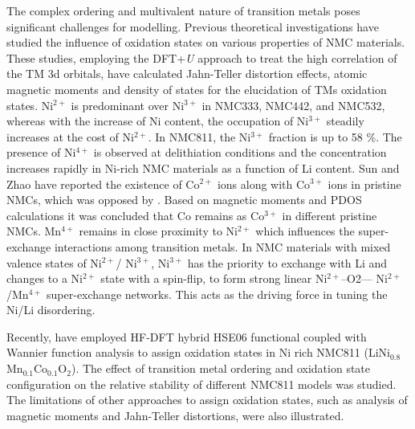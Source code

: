 \documentclass[journal=jacsat,manuscript=article]{achemso}
\newcommand{\re}[1]{\textcolor{red}{#1}}
\begin{document}
The complex ordering and multivalent nature of transition metals poses significant challenges for modelling.
Previous theoretical investigations have studied the influence of oxidation states on various properties of NMC materials. \cite{Dan-Thomas-chemmater,Sun_JPhysChemC2017,Dixit_JPhysChemC2017,Hoang_ACSChemMater2016,Dixit_JElecSoc2017}  These studies, employing the DFT+\textit{U} approach to treat the high correlation of the TM 3d orbitals, have calculated Jahn-Teller distortion effects, atomic magnetic moments and density of states for the elucidation of TMs oxidation states. 
Ni$^{2+}$ is predominant over Ni$^{3+}$ in NMC333, NMC442, and NMC532, whereas with the increase of Ni content, the occupation of Ni$^{3+}$ steadily increases at the cost of Ni$^{2+}$. 
In NMC811, the Ni$^{3+}$  fraction is up to 58 \%. \cite{ Sun_JPhysChemC2017} 
The presence of Ni$^{4+}$ is observed at delithiation conditions and the concentration increases rapidly in Ni-rich NMC materials as a function of Li content. \cite{Dixit_JPhysChemC2017} 
Sun and Zhao \cite{ Sun_JPhysChemC2017} have reported the existence of Co$^{2+}$ ions along with Co$^{3+}$  ions in pristine NMCs, which was opposed by \citeauthor{Dixit_JPhysChemC2017}\cite{ Dixit_JPhysChemC2017}. 
Based on magnetic moments and PDOS calculations it was concluded that Co remains as Co$^{3+}$ in different pristine NMCs. Mn$^{4+}$ remains in close proximity to Ni$^{2+}$ which influences the super-exchange interactions among transition metals. \cite{zheng2019} In NMC materials with mixed valence states of Ni$^{2+}$/ Ni$^{3+}$, Ni$^{3+}$  has the priority to exchange with Li and changes to a Ni$^{2+}$ state with a spin-flip, to form strong linear Ni$^{2+}$–O2–– Ni$^{2+}$ /Mn$^{4+}$ super-exchange networks. 
This acts as the driving force in tuning the Ni/Li disordering. \cite{zheng2019,Zheng-acs.jpclett-2017} 

%
%
Recently, \re{\citeauthor{rana}} have employed HF-DFT hybrid HSE06 functional coupled with Wannier function analysis to assign oxidation states in Ni rich NMC811 (LiNi$_{0.8}$Mn$_{0.1}$Co$_{0.1}$O$_{2}$). \cite{rana} The effect of transition metal ordering and oxidation state configuration on the relative stability of different NMC811 models was studied. The limitations of other approaches to assign oxidation states, such as analysis of magnetic moments and Jahn-Teller distortions, were also illustrated.
\end{document}
